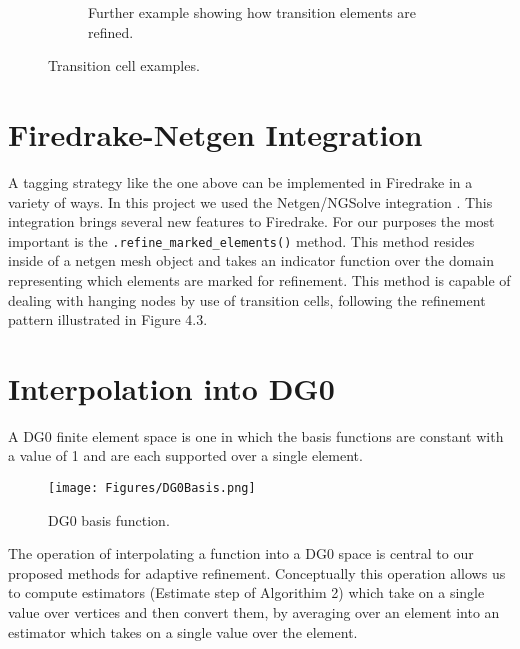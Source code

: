 \documentclass[12 pt]{report}
\begin{document}
\begin{figure}[H]
\begin{subfigure}[b]{\textwidth}
      \caption{Further example showing how transition elements are refined.}
      \label{fig:subfig2}
  \end{subfigure}
  \vspace*{.25cm}
  \caption{Transition cell examples.}
  \label{fig:mainfig}
\end{figure}




\section{Firedrake-Netgen Integration}
A tagging strategy like the one above can be implemented in Firedrake in a variety of ways. In this project we used the Netgen/NGSolve integration \citep{zerbinati_ngspetsc_nodate}. This integration brings several new features to Firedrake. For our purposes the most important is the \texttt{.refine\_marked\_elements()} method. This method resides inside of a netgen mesh object and takes an indicator function over the domain representing which elements are marked for refinement. This method is capable of dealing with hanging nodes by use of transition cells, following the refinement pattern illustrated in Figure 4.3. 



\section{Interpolation into DG0}
A DG0 finite element space is one in which the basis functions are constant with a value of 1 and are each supported over a single element.
\begin{figure}[H]
  \centering
  \texttt{[image: Figures/DG0Basis.png]}
  \caption{DG0 basis function.}
\end{figure}
The operation of interpolating a function into a DG0 space is central to our proposed methods for adaptive refinement. Conceptually this operation allows us to compute estimators (Estimate step of Algorithim 2) which take on a single value over vertices and then convert them, by averaging over an element into an estimator which takes on a single value over the element. 
\end{document}
